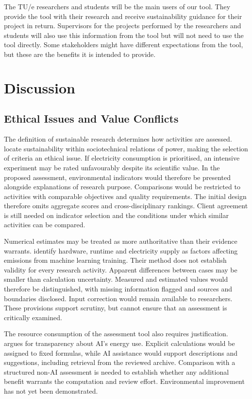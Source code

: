 \documentclass[11pt,a4paper]{article}
\begin{document}
The TU/e researchers and students will be the main users of our tool. They provide the tool with their research and receive sustainability guidance for their project in return.  Supervisors for the projects performed by the researchers and students will also use this information from the tool but will not need to use the tool directly.  Some stakeholders might have different expectations from the tool, but these are the benefits it is intended to provide.

\FloatBarrier
\clearpage
\section{Discussion}

\subsection{Ethical Issues and Value Conflicts}

The definition of sustainable research determines how activities are assessed. \citet{hasselbalch2025sustainability} locate sustainability within sociotechnical relations of power, making the selection of criteria an ethical issue. If electricity consumption is prioritised, an intensive experiment may be rated unfavourably despite its scientific value. In the proposed assessment, environmental indicators would therefore be presented alongside explanations of research purpose. Comparisons would be restricted to activities with comparable objectives and quality requirements. The initial design therefore omits aggregate scores and cross-disciplinary rankings. Client agreement is still needed on indicator selection and the conditions under which similar activities can be compared.

Numerical estimates may be treated as more authoritative than their evidence warrants. \citet{lacoste2019carbon} identify hardware, runtime and electricity supply as factors affecting emissions from machine learning training. Their method does not establish validity for every research activity. Apparent differences between cases may be smaller than calculation uncertainty. Measured and estimated values would therefore be distinguished, with missing information flagged and sources and boundaries disclosed. Input correction would remain available to researchers. These provisions support scrutiny, but cannot ensure that an assessment is critically examined.

The resource consumption of the assessment tool also requires justification. \citet{lin2023cost} argues for transparency about AI's energy use. Explicit calculations would be assigned to fixed formulas, while AI assistance would support descriptions and suggestions, including retrieval from the reviewed archive. Comparison with a structured non-AI assessment is needed to establish whether any additional benefit warrants the computation and review effort. Environmental improvement has not yet been demonstrated.
\end{document}
